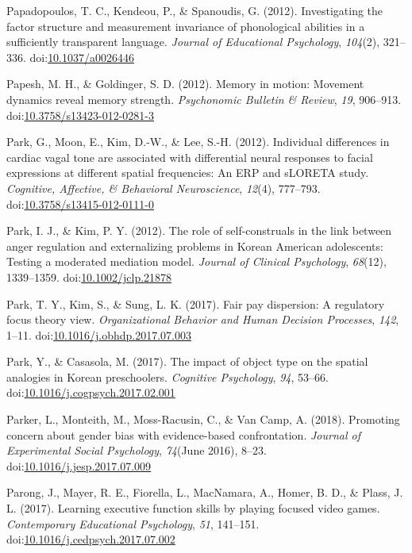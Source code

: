 \documentclass[english,man]{apa6}
\begin{document}
\hypertarget{ref-Papadopoulos2012}{}
Papadopoulos, T. C., Kendeou, P., \& Spanoudis, G. (2012). Investigating
the factor structure and measurement invariance of phonological
abilities in a sufficiently transparent language. \emph{Journal of
Educational Psychology}, \emph{104}(2), 321--336.
doi:\href{https://doi.org/10.1037/a0026446}{10.1037/a0026446}

\hypertarget{ref-Papesh2012}{}
Papesh, M. H., \& Goldinger, S. D. (2012). Memory in motion: Movement
dynamics reveal memory strength. \emph{Psychonomic Bulletin \& Review},
\emph{19}, 906--913.
doi:\href{https://doi.org/10.3758/s13423-012-0281-3}{10.3758/s13423-012-0281-3}

\hypertarget{ref-Park2012}{}
Park, G., Moon, E., Kim, D.-W., \& Lee, S.-H. (2012). Individual
differences in cardiac vagal tone are associated with differential
neural responses to facial expressions at different spatial frequencies:
An ERP and sLORETA study. \emph{Cognitive, Affective, \& Behavioral
Neuroscience}, \emph{12}(4), 777--793.
doi:\href{https://doi.org/10.3758/s13415-012-0111-0}{10.3758/s13415-012-0111-0}

\hypertarget{ref-Park2012a}{}
Park, I. J., \& Kim, P. Y. (2012). The role of self-construals in the
link between anger regulation and externalizing problems in Korean
American adolescents: Testing a moderated mediation model. \emph{Journal
of Clinical Psychology}, \emph{68}(12), 1339--1359.
doi:\href{https://doi.org/10.1002/jclp.21878}{10.1002/jclp.21878}

\hypertarget{ref-Park2017}{}
Park, T. Y., Kim, S., \& Sung, L. K. (2017). Fair pay dispersion: A
regulatory focus theory view. \emph{Organizational Behavior and Human
Decision Processes}, \emph{142}, 1--11.
doi:\href{https://doi.org/10.1016/j.obhdp.2017.07.003}{10.1016/j.obhdp.2017.07.003}

\hypertarget{ref-Park2017a}{}
Park, Y., \& Casasola, M. (2017). The impact of object type on the
spatial analogies in Korean preschoolers. \emph{Cognitive Psychology},
\emph{94}, 53--66.
doi:\href{https://doi.org/10.1016/j.cogpsych.2017.02.001}{10.1016/j.cogpsych.2017.02.001}

\hypertarget{ref-Parker2018}{}
Parker, L., Monteith, M., Moss-Racusin, C., \& Van Camp, A. (2018).
Promoting concern about gender bias with evidence-based confrontation.
\emph{Journal of Experimental Social Psychology}, \emph{74}(June 2016),
8--23.
doi:\href{https://doi.org/10.1016/j.jesp.2017.07.009}{10.1016/j.jesp.2017.07.009}

\hypertarget{ref-Parong2017}{}
Parong, J., Mayer, R. E., Fiorella, L., MacNamara, A., Homer, B. D., \&
Plass, J. L. (2017). Learning executive function skills by playing
focused video games. \emph{Contemporary Educational Psychology},
\emph{51}, 141--151.
doi:\href{https://doi.org/10.1016/j.cedpsych.2017.07.002}{10.1016/j.cedpsych.2017.07.002}
\end{document}
